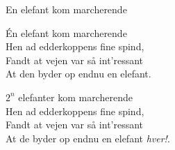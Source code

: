 \begin{song}{En elefant kom marcherende}
  {} %
  {\SBOrgMel} %
  {} %
  {} %
  {\NotCCLIed} %

  \begin{SBVerse}
    Én elefant kom marcherende\\
    Hen ad edderkoppens fine spind,\\
    Fandt at vejen var så int'ressant\\
    At den byder op endnu en elefant.
  \end{SBVerse}
  \renewcommand{\theSBVerseCnt}{$n>0$}

  \begin{SBVerse}
    $2^n$ elefanter kom marcherende\\
    Hen ad edderkoppens fine spind,\\
    Fandt at vejen var så int'ressant\\
    At de byder op endnu en elefant \emph{hver!}.
  \end{SBVerse}
\end{song}